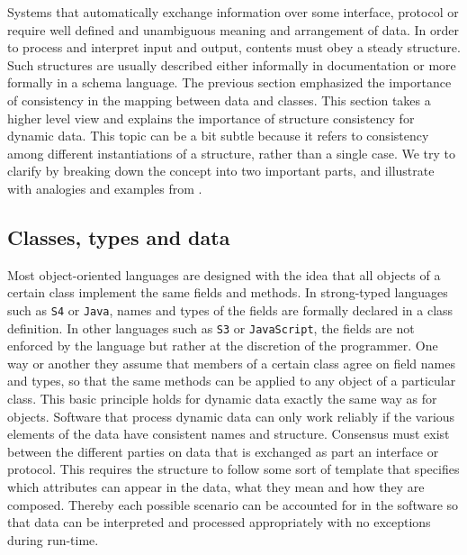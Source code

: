 Systems that automatically exchange information over some interface, protocol or \API require well defined and unambiguous meaning and arrangement of data. In order to process and interpret input and output, contents must obey a steady structure. Such structures are usually described either informally in documentation or more formally in a schema language. The previous section emphasized the importance of consistency in the mapping between \JSON data and \R classes. This section takes a higher level view and explains the importance of structure consistency for dynamic data. This topic can be a bit subtle because it refers to consistency among different instantiations of a \JSON structure, rather than a single case. We try to clarify by breaking down the concept into two important parts, and illustrate with analogies and examples from \R.

\subsection{Classes, types and data}

Most object-oriented languages are designed with the idea that all objects of a certain class implement the same fields and methods. In strong-typed languages such as \texttt{S4} or \texttt{Java}, names and types of the fields are formally declared in a class definition. In other languages such as \texttt{S3} or \texttt{JavaScript}, the fields are not enforced by the language but rather at the discretion of the programmer. One way or another they assume that members of a certain class agree on field names and types, so that the same methods can be applied to any object of a particular class. This basic principle holds for dynamic data exactly the same way as for objects. Software that process dynamic data can only work reliably if the various elements of the data have consistent names and structure. Consensus must exist between the different parties on data that is exchanged as part an interface or protocol. This requires the structure to follow some sort of template that specifies which attributes can appear in the data, what they mean and how they are composed. Thereby each possible scenario can be accounted for in the software so that data can be interpreted and processed appropriately with no exceptions during run-time. 

